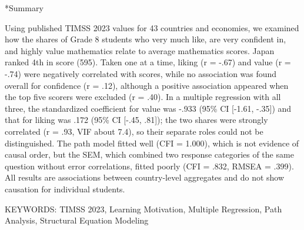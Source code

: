 \documentclass[a4paper,10pt,twocolumn]{ltjsarticle}
\makeatletter
\renewcommand{\section}{\@startsection{section}{1}{\z@}{1.1\Cvs \@plus.4\Cdp \@minus.2\Cdp}{.5\Cvs \@plus.2\Cdp}{\normalfont\gtfamily\bfseries\large}}
\makeatother
\begin{document}
\section*{Summary}
{\footnotesize\setlength{\parindent}{0pt}Using published TIMSS 2023 values for 43 countries and economies, we examined how the shares of Grade 8 students who very much like, are very confident in, and highly value mathematics relate to average mathematics scores. Japan ranked 4th in score (595). Taken one at a time, liking (r = -.67) and value (r = -.74) were negatively correlated with scores, while no association was found overall for confidence (r = .12), although a positive association appeared when the top five scorers were excluded (r = .40). In a multiple regression with all three, the standardized coefficient for value was -.933 (95\% CI [-1.61, -.35]) and that for liking was .172 (95\% CI [-.45, .81]); the two shares were strongly correlated (r = .93, VIF about 7.4), so their separate roles could not be distinguished. The path model fitted well (CFI = 1.000), which is not evidence of causal order, but the SEM, which combined two response categories of the same question without error correlations, fitted poorly (CFI = .832, RMSEA = .399). All results are associations between country-level aggregates and do not show causation for individual students.\par\smallskip KEYWORDS: TIMSS 2023, Learning Motivation, Multiple Regression, Path Analysis, Structural Equation Modeling\par}
\medskip\noindent{}
\end{document}

